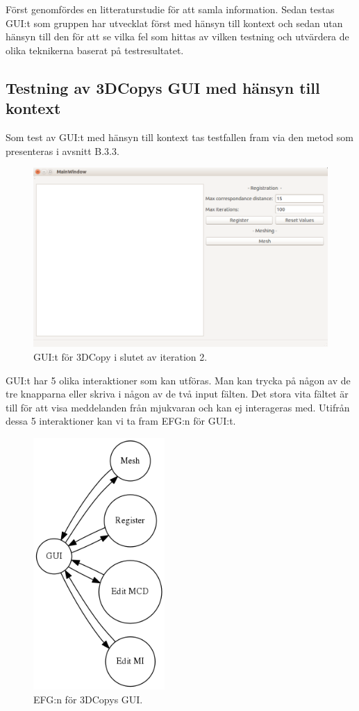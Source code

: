 Först genomfördes en litteraturstudie för att samla information. Sedan testas GUI:t som gruppen har utvecklat först med hänsyn till kontext och sedan utan hänsyn till den för att se vilka fel som hittas av vilken testning och utvärdera de olika teknikerna baserat på testresultatet.

\subsection{Testning av 3DCopys GUI med hänsyn till kontext}

Som test av GUI:t med hänsyn till kontext tas testfallen fram via den metod som presenteras i avsnitt B.3.3.

\begin{figure}[H]
	\centering
	\includegraphics[width=130mm]{figures/3DCopyGUI.PNG}
	\caption{GUI:t för 3DCopy i slutet av iteration 2.}
	\label{fig:3dcopy_gui}
\end{figure}

GUI:t har 5 olika interaktioner som kan utföras. Man kan trycka på någon av de tre knapparna eller skriva i någon av de två input fälten. Det stora vita fältet är till för att visa meddelanden från mjukvaran och kan ej interageras med. Utifrån dessa 5 interaktioner kan vi ta fram EFG:n för GUI:t.

\begin{figure}[H]
	\centering
	\includegraphics[width=50mm]{figures/3DCopyGUIEFG.png}
	\caption{EFG:n för 3DCopys GUI.}
	\label{fig:3dcopy_guiefg}
\end{figure}

